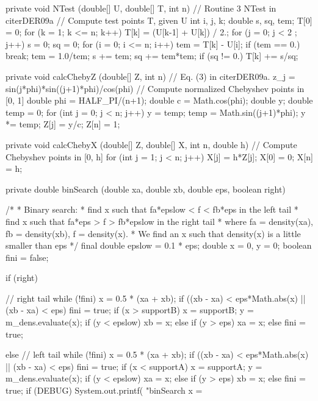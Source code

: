 \begin{hide}
\begin{code}
   private void NTest (double[] U, double[] T, int n) {
      // Routine 3 NTest in cite{rDER09a}
      // Compute test points T, given U
      int i, j, k;
      double s, sq, tem;
      T[0] = 0;
      for (k = 1; k <= n; k++) {
         T[k] = (U[k-1] + U[k]) / 2.;
         for (j = 0; j < 2 ; j++) {
            s = 0;
            sq = 0;
            for (i = 0; i <= n; i++) {
               tem = T[k] - U[i];
               if (tem == 0.)
                  break;
               tem = 1.0/tem;
               s += tem;
               sq += tem*tem;
            }
            if (sq != 0.)
               T[k] += s/sq;
         }
      }
   }


   private void calcChebyZ (double[] Z, int n) {
      // Eq. (3) in cite{rDER09a}. z_j = sin(j*phi)*sin((j+1)*phi)/cos(phi)
      // Compute normalized Chebyshev points in [0, 1]
      double phi = HALF_PI/(n+1);
      double c = Math.cos(phi);
      double y;
      double temp = 0;
      for (int j = 0; j < n; j++) {
         y = temp;
         temp = Math.sin((j+1)*phi);
         y *= temp;
         Z[j] = y/c;
      }
      Z[n] = 1;
   }


   private void calcChebyX (double[] Z, double[] X, int n, double h) {
      // Compute Chebyshev points in [0, h]
      for (int j = 1; j < n; j++)
         X[j] = h*Z[j];
      X[0] = 0;
      X[n] = h;
   }


   private double binSearch (double xa, double xb, double eps,
                                             boolean right) {
      /*
       * Binary search:
       *    find x such that   fa*epslow < f < fb*eps in the left tail
       *    find x such that   fa*eps > f > fb*epslow in the right tail
       *    where fa = density(xa), fb = density(xb),  f = density(x).
       * We find an x such that density(x) is a little smaller than eps
       */
      final double epslow = 0.1 * eps;
      double x = 0, y = 0;
      boolean fini = false;

      if (right) {    // right tail
         while (!fini) {
            x = 0.5 * (xa + xb);
            if ((xb - xa) < eps*Math.abs(x) || (xb - xa) < eps) {
               fini = true;
               if (x > supportB)
                  x = supportB;
            }
            y = m_dens.evaluate(x);
            if (y < epslow) {
               xb = x;
            } else if (y > eps) {
               xa = x;
            } else
               fini = true;
         }

      } else {   // left tail
         while (!fini) {
            x = 0.5 * (xa + xb);
            if ((xb - xa) < eps*Math.abs(x) || (xb - xa) < eps) {
               fini = true;
               if (x < supportA)
                  x = supportA;
            }
            y = m_dens.evaluate(x);
            if (y < epslow) {
               xa = x;
            } else if (y > eps) {
               xb = x;
            } else
               fini = true;
         }
      }
      if (DEBUG)
         System.out.printf(
         "binSearch   x =  %

}
\end{code}
\end{hide}
